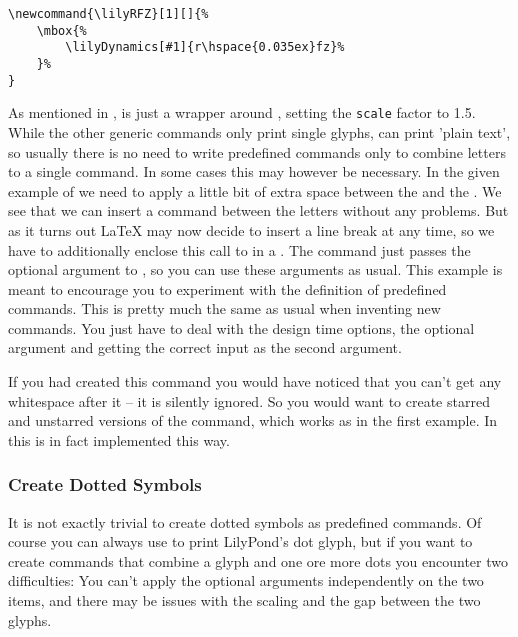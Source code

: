 \documentclass{article}
\begin{document}
\begin{verbatim}
\newcommand{\lilyRFZ}[1][]{%
    \mbox{%
        \lilyDynamics[#1]{r\hspace{0.035ex}fz}%
    }%
}
\end{verbatim}
As mentioned in ,  is just a wrapper around , setting the \texttt{scale} factor to 1.5.
While the other generic commands only print single glyphs,  can print 'plain text', so usually there is no need to write predefined commands only to combine letters to a single command.
In some cases this may however be necessary.
In the given example of  we need to apply a little bit of extra space between the  and the .
We see that we can insert a  command between the letters without any problems.
But as it turns out \LaTeX{} may now decide to insert a line break at any time, so we have to additionally enclose this call to  in a .
The command just passes the optional argument to , so you can use these arguments as usual.
This example is meant to encourage you to experiment with the definition of predefined commands. This is pretty much the same as usual when inventing new commands. You just have to deal with the design time options, the optional argument and getting the correct input as the second argument.

If you had created this command you would have noticed that you can't get any whitespace after it -- it is silently ignored.
So you would want to create starred and unstarred versions of the command, which works as in the first example. 
In \lilyglyphs{} this is in fact implemented this way.



\subsubsection{Create Dotted Symbols}
\label{subsubsec:dotted_symbols}

It is not exactly trivial to  create dotted symbols as predefined commands.
Of course you can always use  to print LilyPond's dot glyph, but if you want to create commands that combine a glyph and one ore more dots you encounter two difficulties:
You can't apply the optional arguments independently on the two items, and there may be issues with the scaling and the gap between the two glyphs.
\end{document}
